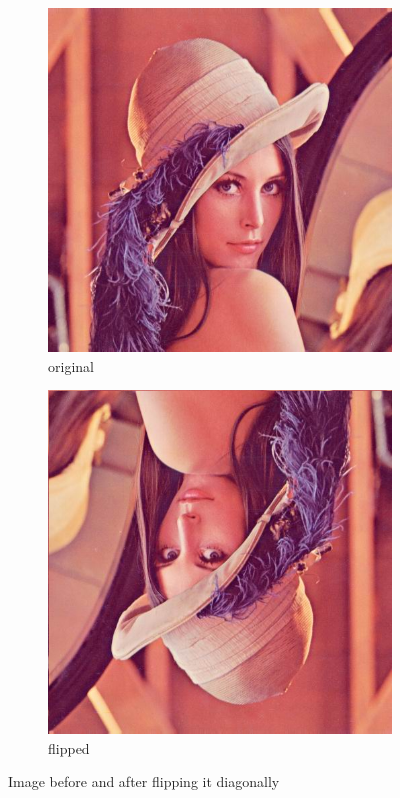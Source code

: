 \documentclass[12pt]{article}
\theoremstyle{definition}
\newcommand{\subfiguresize}{.3\textwidth}
\begin{document}
\begin{figure}[H]\centering
    \begin{subfigure}[t]{\subfiguresize}\centering
        \includegraphics[width=\textwidth]{lenac.png}
        \caption{original}
    \end{subfigure}
    \hspace{.05\textwidth}
    \begin{subfigure}[t]{\subfiguresize}\centering
        \includegraphics[width=\textwidth]{lenac_dflip.png}
        \caption{flipped}
    \end{subfigure}
    \caption{Image before and after flipping it diagonally}
\end{figure}
\end{document}
